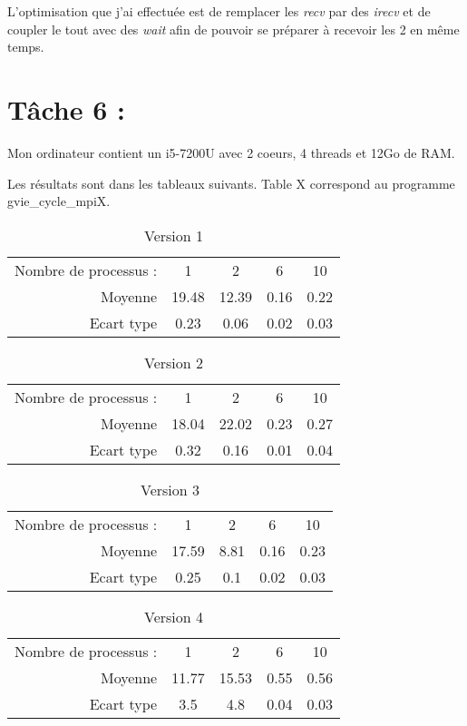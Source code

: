 \documentclass{article}
\begin{document}
L'optimisation que j'ai effectuée est de remplacer les \textit{recv} par des \textit{irecv} et de coupler le tout avec des \textit{wait} afin de pouvoir se préparer à recevoir les 2 en même temps.

\section*{Tâche 6 :}

Mon ordinateur contient un i5-7200U avec 2 coeurs, 4 threads et 12Go de RAM.

Les résultats sont dans les tableaux suivants. Table X correspond au programme gvie\_cycle\_mpiX.

\begin{table}[]
\centering
\caption{Version 1}
\label{my-label}
\begin{tabular}{rcccc}
\multicolumn{1}{l}{Nombre de processus :} & 1     & 2     & 6    & 10   \\
Moyenne                                   & 19.48 & 12.39 & 0.16 & 0.22 \\
Ecart type                                & 0.23  & 0.06  & 0.02 & 0.03
\end{tabular}
\end{table}

\begin{table}[]
\centering
\caption{Version 2}
\label{my-label}
\begin{tabular}{rcccc}
\multicolumn{1}{l}{Nombre de processus :} & 1     & 2     & 6    & 10   \\
Moyenne                                   & 18.04 & 22.02 & 0.23 & 0.27 \\
Ecart type                                & 0.32  & 0.16  & 0.01 & 0.04
\end{tabular}
\end{table}

\begin{table}[]
\centering
\caption{Version 3}
\label{my-label}
\begin{tabular}{rcccc}
\multicolumn{1}{l}{Nombre de processus :} & 1     & 2    & 6    & 10   \\
Moyenne                                   & 17.59 & 8.81 & 0.16 & 0.23 \\
Ecart type                                & 0.25  & 0.1  & 0.02 & 0.03
\end{tabular}
\end{table}

\begin{table}[]
\centering
\caption{Version 4}
\label{my-label}
\begin{tabular}{rcccc}
\multicolumn{1}{l}{Nombre de processus :} & 1     & 2     & 6    & 10   \\
Moyenne                                   & 11.77 & 15.53 & 0.55 & 0.56 \\
Ecart type                                & 3.5   & 4.8   & 0.04 & 0.03
\end{tabular}
\end{table}
\end{document}

